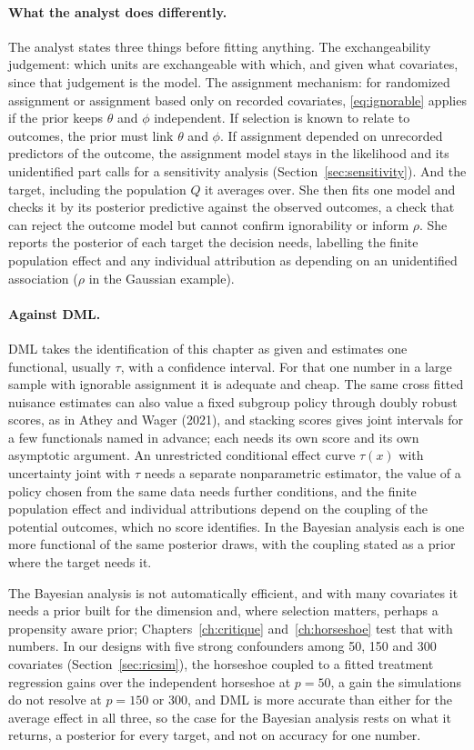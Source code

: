 \paragraph{What the analyst does differently.} The analyst states three things before fitting anything. The exchangeability judgement: which units are exchangeable with which, and given what covariates, since that judgement is the model. The assignment mechanism: for randomized assignment or assignment based only on recorded covariates, \eqref{eq:ignorable} applies if the prior keeps $\theta$ and $\phi$ independent. If selection is known to relate to outcomes, the prior must link $\theta$ and $\phi$. If assignment depended on unrecorded predictors of the outcome, the assignment model stays in the likelihood and its unidentified part calls for a sensitivity analysis (Section~\ref{sec:sensitivity}). And the target, including the population $Q$ it averages over. She then fits one model and checks it by its posterior predictive against the observed outcomes, a check that can reject the outcome model but cannot confirm ignorability or inform $\rho$. She reports the posterior of each target the decision needs, labelling the finite population effect and any individual attribution as depending on an unidentified association ($\rho$ in the Gaussian example).

\paragraph{Against DML.} DML takes the identification of this chapter as given and estimates one functional, usually $\tau$, with a confidence interval. For that one number in a large sample with ignorable assignment it is adequate and cheap. The same cross fitted nuisance estimates can also value a fixed subgroup policy through doubly robust scores, as in Athey and Wager (2021), and stacking scores gives joint intervals for a few functionals named in advance; each needs its own score and its own asymptotic argument.  An unrestricted conditional effect curve $\tau(x)$ with uncertainty joint with $\tau$ needs a separate nonparametric estimator, the value of a policy chosen from the same data needs further conditions, and the finite population effect and individual attributions depend on the coupling of the potential outcomes, which no score identifies. In the Bayesian analysis each is one more functional of the same posterior draws, with the coupling stated as a prior where the target needs it.

The Bayesian analysis is not automatically efficient, and with many covariates it needs a prior built for the dimension and, where selection matters, perhaps a propensity aware prior; Chapters~\ref{ch:critique} and~\ref{ch:horseshoe} test that with numbers. In our designs with five strong confounders among 50, 150 and 300 covariates (Section~\ref{sec:ricsim}), the horseshoe coupled to a fitted treatment regression gains over the independent horseshoe at $p = 50$, a gain the simulations do not resolve at $p = 150$ or $300$, and DML is more accurate than either for the average effect in all three, so the case for the Bayesian analysis rests on what it returns, a posterior for every target, and not on accuracy for one number.

